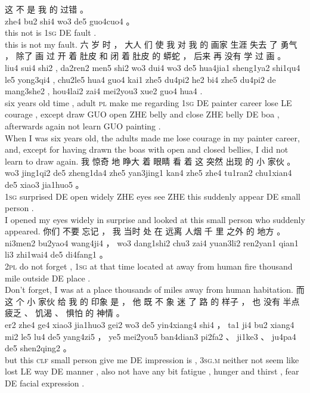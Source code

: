 \documentclass[UTF8]{ctexart}
\begin{document}
\begin{exe}
\ex
\glll
这 不 是 我 的 过错 。
\\
zhe4 bu2 shi4 wo3 de5 guo4cuo4 。
\\
this not is \textsc{1sg} DE fault .
\\
\trans this is not my fault.
\ex
\glll
六 岁 时 ， 大人 们 使 我 对 我 的 画家 生涯 失去 了 勇气 ， 除了 画 过 开 着 肚皮 和 闭 着 肚皮 的 蟒蛇 ， 后来 再 没有 学 过 画 。
\\
liu4 sui4 shi2 , da2ren2 men5 shi2 wo3 dui4 wo3 de5 hua4jia1 sheng1ya2 shi1qu4 le5 yong3qi4 , chu2le5 hua4 guo4 kai1 zhe5 du4pi2 he2 bi4 zhe5 du4pi2 de mang3she2 , hou4lai2 zai4 mei2you3 xue2 guo4 hua4 . 
\\
six {years old} time , adult \textsc{pl} make me regarding \textsc{1sg} DE painter career lose LE courage , except draw GUO open ZHE belly and close ZHE belly DE boa , afterwards again not learn GUO painting .
\\
\trans When I was six years old, the adults made me lose courage in my painter career, and, except for having drawn the boas with open and closed bellies, I did not learn to draw again.
\ex
\glll
我 惊奇 地 睁大 着 眼睛 看 着 这 突然 出现 的 小 家伙 。
\\
wo3 jing1qi2 de5 zheng1da4 zhe5 yan3jing1 kan4 zhe5 zhe4 tu1ran2 chu1xian4 de5 xiao3 jia1huo5 。
\\
\textsc{1sg} surprised DE {open widely} ZHE eyes see ZHE this suddenly appear DE small person .
\\
\trans I opened my eyes widely in surprise and looked at this small person who suddenly appeared. 
\ex
\glll
你们 不要 忘记 ， 我 当时 处 在 远离 人烟 千 里 之外 的 地方 。
\\
ni3men2 bu2yao4 wang4ji4 ， wo3 dang1shi2 chu3 zai4 yuan3li2 ren2yan1 qian1 li3 zhi1wai4 de5 di4fang1 。
\\
\textsc{2pl} {do not} forget , \textsc{1sg} {at that time} {located} at {away from} {human fire} thousand mile {outside} DE place .
\\
\trans Don't forget, I was at a place thousands of miles away from human habitation. 
\ex
\glll
而 这 个 小 家伙 给 我 的 印象 是 ， 他 既 不 象 迷 了 路 的 样子 ， 也 没有 半点 疲乏 、 饥渴 、 惧怕 的 神情 。
\\
er2 zhe4 ge4 xiao3 jia1huo3 gei2 wo3 de5 yin4xiang4 shi4 ， ta1 ji4 bu2 xiang4 mi2 le5 lu4 de5 yang4zi5 ， ye5 mei2you5 ban4dian3 pi2fa2 、 ji1ke3 、 ju4pa4 de5 shen2qing2 。
\\
but this \textsc{clf} small person give me DE impression is , \textsc{3sg.m} neither not {seem like} lost LE way DE manner , also {not have} {any bit} fatigue , {hunger and thirst} , fear DE {facial expression} .

\end{exe}
\end{document}
